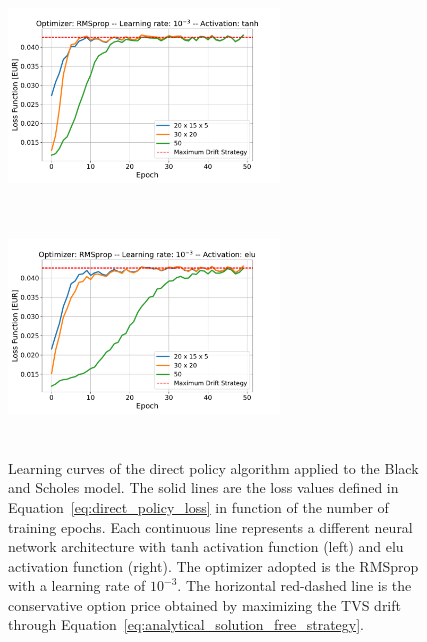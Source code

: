\documentclass[11pt]{article}
\begin{document}
 \begin{figure}[h!]
	\centering
	\includegraphics[width=7.2cm,height=6cm]{BS_fine_tuning_RMSprop_tanh.pdf}
	\includegraphics[width=7.2cm,height=6cm]{BS_fine_tuning_RMSprop_elu.pdf}
	\caption{Learning curves of the direct policy algorithm applied to the Black and Scholes model. The solid lines are the loss values defined in Equation~\eqref{eq:direct_policy_loss} in function of the number of training epochs. Each continuous line represents a different neural network architecture with tanh activation function (left) and elu activation function (right). The optimizer adopted is the RMSprop with a learning rate of $10^{-3}$. The horizontal red-dashed line is the conservative option price obtained by maximizing the TVS drift through Equation~\eqref{eq:analytical_solution_free_strategy}.}
	\label{fig:result_bs_rmsprop}
\end{figure}  
\end{document}
